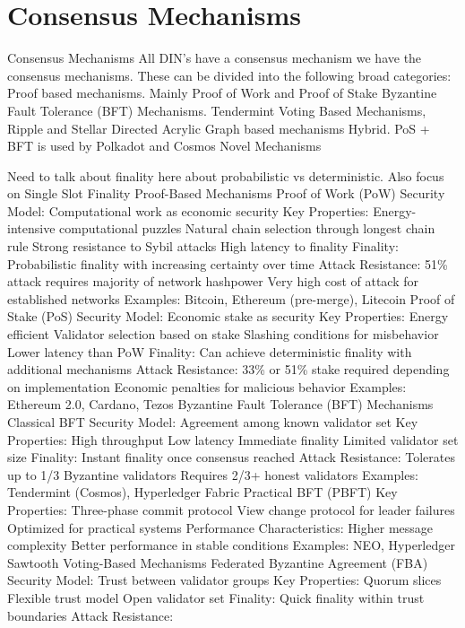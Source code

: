 \documentclass[
  letterpaper,
  DIV=11,
  numbers=noendperiod]{scrreprt}
\begin{document}
\section{Consensus Mechanisms}\label{consensus-mechanisms}

Consensus Mechanisms All DIN's have a consensus mechanism we have the
consensus mechanisms. These can be divided into the following broad
categories: Proof based mechanisms. Mainly Proof of Work and Proof of
Stake Byzantine Fault Tolerance (BFT) Mechanisms. Tendermint Voting
Based Mechanisms, Ripple and Stellar Directed Acrylic Graph based
mechanisms Hybrid. PoS + BFT is used by Polkadot and Cosmos Novel
Mechanisms

Need to talk about finality here about probabilistic vs deterministic.
Also focus on Single Slot Finality Proof-Based Mechanisms Proof of Work
(PoW) Security Model: Computational work as economic security Key
Properties: Energy-intensive computational puzzles Natural chain
selection through longest chain rule Strong resistance to Sybil attacks
High latency to finality Finality: Probabilistic finality with
increasing certainty over time Attack Resistance: 51\% attack requires
majority of network hashpower Very high cost of attack for established
networks Examples: Bitcoin, Ethereum (pre-merge), Litecoin Proof of
Stake (PoS) Security Model: Economic stake as security Key Properties:
Energy efficient Validator selection based on stake Slashing conditions
for misbehavior Lower latency than PoW Finality: Can achieve
deterministic finality with additional mechanisms Attack Resistance:
33\% or 51\% stake required depending on implementation Economic
penalties for malicious behavior Examples: Ethereum 2.0, Cardano, Tezos
Byzantine Fault Tolerance (BFT) Mechanisms Classical BFT Security Model:
Agreement among known validator set Key Properties: High throughput Low
latency Immediate finality Limited validator set size Finality: Instant
finality once consensus reached Attack Resistance: Tolerates up to 1/3
Byzantine validators Requires 2/3+ honest validators Examples:
Tendermint (Cosmos), Hyperledger Fabric Practical BFT (PBFT) Key
Properties: Three-phase commit protocol View change protocol for leader
failures Optimized for practical systems Performance Characteristics:
Higher message complexity Better performance in stable conditions
Examples: NEO, Hyperledger Sawtooth Voting-Based Mechanisms Federated
Byzantine Agreement (FBA) Security Model: Trust between validator groups
Key Properties: Quorum slices Flexible trust model Open validator set
Finality: Quick finality within trust boundaries Attack Resistance:
\end{document}

